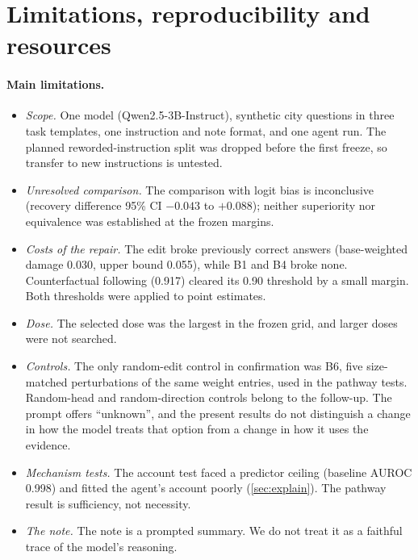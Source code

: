 \section{Limitations, reproducibility and resources}
\label{sec:limits}

\paragraph{Main limitations.}
\begin{itemize}[leftmargin=*]
  \item \emph{Scope.} One model (Qwen2.5-3B-Instruct), synthetic city questions in three task templates, one
        instruction and note format, and one agent run. The planned reworded-instruction split was dropped before the
        first freeze, so transfer to new instructions is untested.
  \item \emph{Unresolved comparison.} The comparison with logit bias is inconclusive (recovery difference 95\% CI
        $-0.043$ to $+0.088$); neither superiority nor equivalence was established at the frozen margins.
  \item \emph{Costs of the repair.} The edit broke previously correct answers (base-weighted damage 0.030, upper bound
        0.055), while B1 and B4 broke none. Counterfactual following (0.917) cleared its 0.90 threshold by a small
        margin. Both thresholds were applied to point estimates.
  \item \emph{Dose.} The selected dose was the largest in the frozen grid, and larger doses were not searched.
  \item \emph{Controls.} The only random-edit control in confirmation was B6, five size-matched perturbations of the
        same weight entries, used in the pathway tests. Random-head and random-direction controls belong to the
        follow-up. The prompt offers ``unknown'', and the present results do not distinguish a change in how the
        model treats that option from a change in how it uses the evidence.
  \item \emph{Mechanism tests.} The account test faced a predictor ceiling (baseline AUROC 0.998) and fitted the
        agent's account poorly (\cref{sec:explain}). The pathway result is sufficiency, not necessity.
  \item \emph{The note.} The note is a prompted summary. We do not treat it as a faithful trace of the model's
        reasoning.
\end{itemize}

